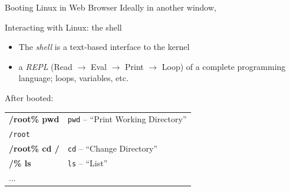 \documentclass{beamer} \usetheme{Madrid}
\begin{document}
\begin{frame}{Booting Linux in Web Browser}
    \vfill
        Ideally in another window,
    \vfill
\end{frame}

\begin{frame}{Interacting with Linux: the shell}
    \begin{itemize}
        \item The \emph{shell} is a text-based interface to the kernel
        \item a \emph{REPL} (Read $\rightarrow$ Eval $\rightarrow$ Print $\rightarrow$ Loop) of a complete programming language; loops, variables, etc.
    \end{itemize}
    \vspace{7mm}
    After booted:\\[5mm]
    \begin{tabular}{ll}
        \textbf{/root\% pwd} \hspace{15mm} & \texttt{pwd} -- ``Print Working Directory''\\
        \texttt{/root} \\
        \textbf{/root\% cd /} & \texttt{cd} -- ``Change Directory''\\
        \textbf{/\% ls} & \texttt{ls} -- ``List'' \\
        ...
    \end{tabular}
\end{frame}
\end{document}
